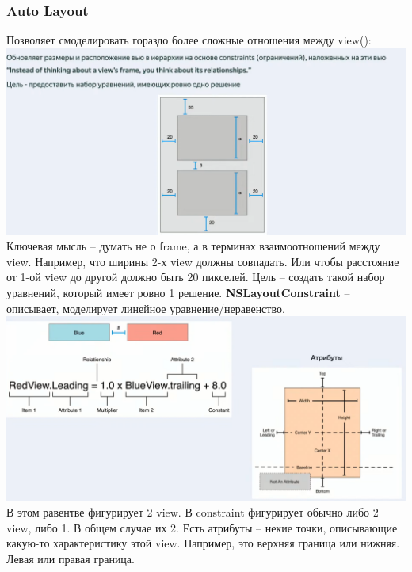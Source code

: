 \documentclass{article}
\begin{document}
    \subsubsection{Auto Layout}
    Позволяет смоделировать гораздо более сложные отношения между view():
    \newline
    \includegraphics[scale = 0.3]{pic/Снимок экрана 2023-07-31 в 21.39.23.png}
    \newline
    Ключевая мысль -- думать не о frame, а в терминах взаимоотношений между view. Например, что ширины 2-х view должны совпадать. Или чтобы расстояние от 1-ой view до другой должно быть 20 пикселей. 
    \newline
    Цель -- создать такой набор уравнений, который имеет ровно 1 решение. 
    \newline
    \textbf{NSLayoutConstraint} -- описывает, моделирует линейное уравнение/неравенство. 
    \newline
    \includegraphics[scale = 0.3]{pic/Снимок экрана 2023-07-31 в 21.41.16.png}
    \newline
    В этом равентве фигурирует 2 view. В constraint фигурирует обычно либо 2 view, либо 1. В общем случае их 2. Есть атрибуты -- некие точки, описывающие какую-то характеристику этой view. Например, это верхняя граница или нижняя. Левая или правая граница. 
    \newline
\end{document}
